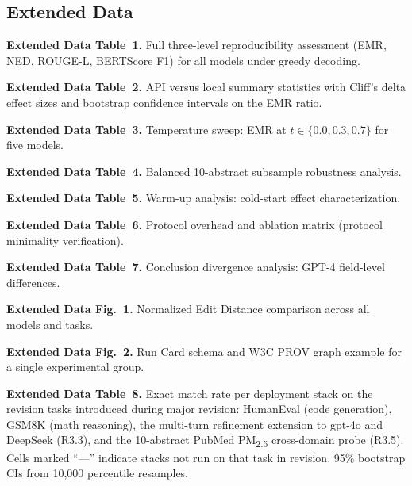 \documentclass[sn-nature]{sn-jnl}
\begin{document}

\begin{appendices}

\section{Extended Data}\label{sec:extdata}

\noindent\textbf{Extended Data Table~1.}
Full three-level reproducibility assessment (EMR, NED, ROUGE-L, BERTScore F1)
for all models under greedy decoding.

\medskip\noindent\textbf{Extended Data Table~2.}
API versus local summary statistics with Cliff's delta effect sizes
and bootstrap confidence intervals on the EMR ratio.

\medskip\noindent\textbf{Extended Data Table~3.}
Temperature sweep: EMR at $t \in \{0.0, 0.3, 0.7\}$ for five models.

\medskip\noindent\textbf{Extended Data Table~4.}
Balanced 10-abstract subsample robustness analysis.

\medskip\noindent\textbf{Extended Data Table~5.}
Warm-up analysis: cold-start effect characterization.

\medskip\noindent\textbf{Extended Data Table~6.}
Protocol overhead and ablation matrix (protocol minimality verification).

\medskip\noindent\textbf{Extended Data Table~7.}
Conclusion divergence analysis: GPT-4 field-level differences.

\medskip\noindent\textbf{Extended Data Fig.~1.}
Normalized Edit Distance comparison across all models and tasks.

\medskip\noindent\textbf{Extended Data Fig.~2.}
Run Card schema and W3C PROV graph example for a single experimental group.

\medskip\noindent\textbf{Extended Data Table~8.}
Exact match rate per deployment stack on the revision tasks introduced during major revision: HumanEval (code generation), GSM8K (math reasoning), the multi-turn refinement extension to gpt-4o and DeepSeek (R3.3), and the 10-abstract PubMed PM\textsubscript{2.5} cross-domain probe (R3.5). Cells marked ``---'' indicate stacks not run on that task in revision. 95\% bootstrap CIs from 10{,}000 percentile resamples.


\end{appendices}
\end{document}
